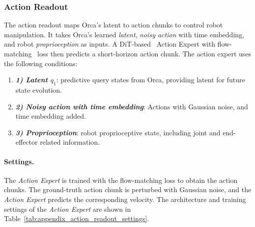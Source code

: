 \subsubsection{Action Readout}
\label{sec:appendix_action_readout}
The action readout maps Orca's latent to action chunks to control robot manipulation. It takes Orca's learned \textit{latent}, \textit{noisy action} with time embedding, and robot \textit{proprioception} as inputs. A DiT-based~\citep{dit} Action Expert with flow-matching~\citep{flow_matching} loss then predicts a short-horizon action chunk. The action expert uses the following conditions: 

\begin{enumerate}[
    leftmargin=1.35em,
    itemsep=0.35em,
    topsep=0.35em,
    parsep=0em
]
    \item[] \textbf{\textit{1) Latent \(q_1\)}}: predictive query states from Orca, providing latent for future state evolution. 
    \item[] \textbf{\textit{2) Noisy action with time embedding}}: Actions with Gaussian noise, and time embedding added.
    \item[] \textbf{\textit{3) Proprioception}}: robot proprioceptive state, including joint and end-effector related information. 
\end{enumerate} 


\paragraph{Settings.} 
The \textit{Action Expert} is trained with the flow-matching loss to obtain the action chunks. The ground-truth action chunk is perturbed with Gaussian noise, and the \textit{Action Expert} predicts the corresponding velocity.
The architecture and training settings of the \textit{Action Expert} are shown in Table~\ref{tab:appendix_action_readout_settings}.

